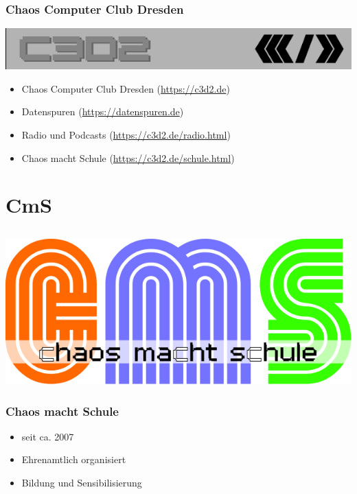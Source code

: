 \documentclass[12pt]{beamer}
\begin{document}
\begin{frame}
	\frametitle{Chaos Computer Club Dresden}
	\begin{center}
		\includegraphics[height=0.1\textheight]{img/c3d2_logo.png}
	\end{center}
	\begin{itemize}
		\item<1-> Chaos Computer Club Dresden (\url{https://c3d2.de})          
		\item<2-> Datenspuren (\url{https://datenspuren.de})
		\item<3-> Radio und Podcasts (\url{https://c3d2.de/radio.html})
		\item<4-> Chaos macht Schule (\url{https://c3d2.de/schule.html})
	\end{itemize}
\end{frame}
  
\section{CmS}
\subsection{}

\begin{frame}
	\begin{center}
    	\includegraphics[height=0.5\textheight]{img/cms-text.png}
    \end{center}
\end{frame}
  
\begin{frame}
	\frametitle{Chaos macht Schule}
	\begin{itemize}
		\item<1-> seit ca. 2007
		\item<2-> Ehrenamtlich organisiert
		\item<3-> Bildung und Sensibilisierung
	\end{itemize}
\end{frame}
  
\end{document}
